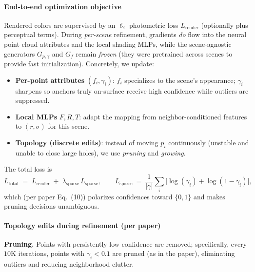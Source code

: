 \begin{enrichment}
\begin{enrichment}
\begin{enrichment}
        \paragraph{End-to-end optimization objective}
        Rendered colors are supervised by an $\ell_2$ photometric loss $L_{\text{render}}$ (optionally plus perceptual terms). During \emph{per-scene} refinement, gradients \emph{do} flow into the neural point cloud attributes and the local shading MLPs, while the scene-agnostic generators $G_{p,\gamma}$ and $G_f$ remain \emph{frozen} (they were pretrained across scenes to provide fast initialization). Concretely, we update:
        \begin{itemize}
            \item \textbf{Per-point attributes} $(f_i,\gamma_i)$: $f_i$ specializes to the scene’s appearance; $\gamma_i$ sharpens so anchors truly on-surface receive high confidence while outliers are suppressed.
            \item \textbf{Local MLPs} $F,R,T$: adapt the mapping from neighbor-conditioned features to $(r,\sigma)$ for this scene.
            \item \textbf{Topology (discrete edits)}: instead of moving $p_i$ continuously (unstable and unable to close large holes), we use \emph{pruning} and \emph{growing}.
        \end{itemize}
        
        \newpage
        \noindent
        The total loss is
        \[
        L_{\text{total}} \;=\; L_{\text{render}} \;+\; \lambda_{\text{sparse}}\,L_{\text{sparse}},
        \qquad
        L_{\text{sparse}}
        ~=~
        \frac{1}{|\gamma|}\sum_i\!\big[\log(\gamma_i)+\log(1-\gamma_i)\big],
        \]
        which (per paper Eq.~(10)) polarizes confidences toward $\{0,1\}$ and makes pruning decisions unambiguous.
        
        \paragraph{Topology edits during refinement (per paper)}
        \textbf{Pruning.} Points with persistently low confidence are removed; specifically, every $10\mathrm{K}$ iterations, points with $\gamma_i<0.1$ are pruned (as in the paper), eliminating outliers and reducing neighborhood clutter.
        

\end{enrichment}
\end{enrichment}
\end{enrichment}
